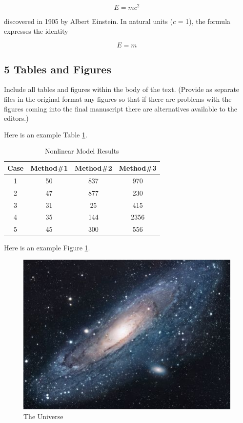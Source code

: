 \documentclass[10pt]{article}
\begin{document}
$$E=mc^2$$

discovered in 1905 by Albert Einstein.
In natural units ($c$ = 1), the formula expresses the identity

\begin{equation}
E=m
\end{equation}

\subsection*{5 Tables and Figures}
Include all tables and figures within the body of the text. (Provide as separate files in the original format any figures so that if there are problems with the figures coming into the final manuscript there are alternatives available to the editors.)

Here is an example Table \ref{table:nonlin}.

\begin{table}[ht]
\caption{Nonlinear Model Results} %
\label{table:nonlin} %
\centering %
\begin{tabular}{c c c c} %
\hline\hline %
Case & Method\#1 & Method\#2 & Method\#3 \\ [0.5ex] %
\hline %
1 & 50 & 837 & 970 \\ %
2 & 47 & 877 & 230 \\
3 & 31 & 25 & 415 \\
4 & 35 & 144 & 2356 \\
5 & 45 & 300 & 556 \\ [1ex] %
\hline %
\end{tabular}
\end{table}

Here is an example Figure \ref{figure:universe}.

\begin{figure}[h!]
\centering
\includegraphics[scale=1.7]{universe}
\caption{The Universe}
\label{figure:universe}
\end{figure}
\end{document}
